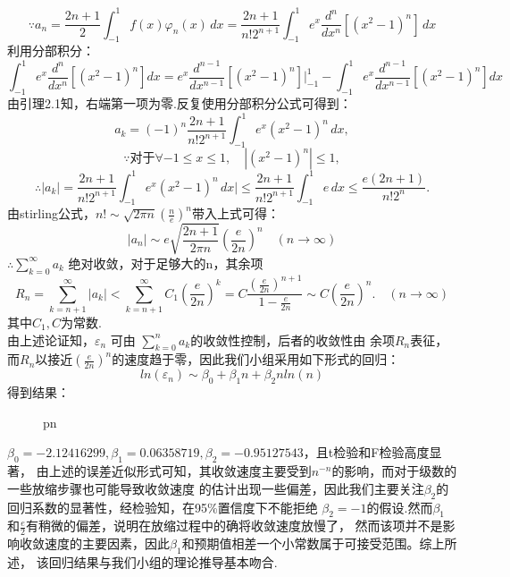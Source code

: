 \documentclass{article}
\begin{document}
    $$\because a_n=\frac{2n+1}{2}\int_{-1}^{1} f(x)\varphi_n(x)\,dx
    =\frac{2n+1}{n!2^{n+1}}\int_{-1}^{1} e^x \frac{d^n}{dx^n}[(x^2-1)^n]\,dx
    $$
    利用分部积分：
    $$\int_{-1}^{1} e^x \frac{d^n}{dx^n}[(x^2-1)^n]dx=
    e^x\frac{d^{n-1}}{dx^{n-1}}[(x^2-1)^n]|_{-1}^{1}-
    \int_{-1}^{1} e^x \frac{d^{n-1}}{dx^{n-1}}[(x^2-1)^n]dx
    $$
    由引理2.1知，右端第一项为零.反复使用分部积分公式可得到：
    $$a_k=(-1)^{n}\frac{2n+1}{n!2^{n+1}}\int_{-1}^{1} e^x(x^2-1)^n\,dx ,
    $$
    $$\because 对于\forall -1\leqslant x \leqslant 1,\quad |(x^2-1)^n|\leqslant 1,
    $$
    $$\therefore |a_k|=\frac{2n+1}{n!2^{n+1}}\int_{-1}^{1} e^x(x^2-1)^n\,dx|
    \leqslant \frac{2n+1}{n!2^{n+1}}\int_{-1}^{1}e\,dx \leqslant \frac{e(2n+1)}{n!2^n}.
    $$
    由stirling公式，$n!\sim \sqrt{2\pi n}(\frac{n}{e})^n $带入上式可得：
    $$|a_n|\sim e\sqrt{\frac{2n+1}{2\pi n}}(\frac{e}{2n})^n \quad (n\rightarrow \infty)
    $$
    $\therefore \sum_{k=0}^{\infty} a_k$ 绝对收敛，对于足够大的n，其余项
    $$R_n=\sum_{k=n+1}^{\infty} |a_k| < \sum_{k=n+1}^{\infty} C_1(\frac{e}{2n})^k
    =C\frac{(\frac{e}{2n})^{n+1}}{1-\frac{e}{2n}} \sim C(\frac{e}{2n})^n. \quad (n\rightarrow \infty)
    $$
    其中$C_1,C$为常数.\\
    由上述论证知，$\varepsilon_n$ 可由 $\sum_{k=0}^{n} a_k$的收敛性控制，后者的收敛性由
    余项$R_n$表征，而$R_n$以接近$(\frac{e}{2n})^n$的速度趋于零，因此我们小组采用如下形式的回归：
    $$ln(\varepsilon_n)\sim \beta_0 +\beta_1 n +\beta_2 nln(n)
    $$
    得到结果：
    \begin{figure}[H]
        \centering
        \caption{pn}
    \end{figure}
    $\beta_0=-2.12416299,\beta_1=0.06358719,\beta_2=-0.95127543 $，且t检验和F检验高度显著，
    由上述的误差近似形式可知，其收敛速度主要受到$n^{-n}$的影响，而对于级数的一些放缩步骤也可能导致收敛速度
    的估计出现一些偏差，因此我们主要关注$\beta_2$的回归系数的显著性，经检验知，在95\%置信度下不能拒绝
    $\beta_2=-1$的假设.然而$\beta_1$和$\frac{e}{2}$有稍微的偏差，说明在放缩过程中的确将收敛速度放慢了，
    然而该项并不是影响收敛速度的主要因素，因此$\beta_1$和预期值相差一个小常数属于可接受范围。综上所述，
    该回归结果与我们小组的理论推导基本吻合.\\
\end{document}
